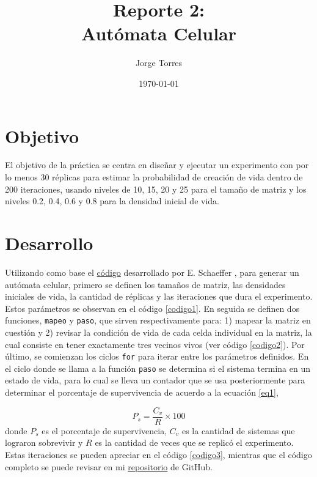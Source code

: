 \documentclass{article}
\title{Reporte 2:\\Aut\'omata Celular}
\author{Jorge Torres}
\date{\today}
\begin{document}
\maketitle

\section{Objetivo}
El objetivo de la pr\'actica se centra en diseñar y ejecutar un experimento con por lo menos 30 r\'eplicas para estimar la probabilidad de creaci\'on de vida dentro de 200 iteraciones, usando niveles de 10, 15, 20 y 25 para el tamaño de matriz y los niveles 0.2, 0.4, 0.6 y 0.8 para la densidad inicial de vida.

\section{Desarrollo}
Utilizando como base el \href{https://github.com/satuelisa/Simulation/blob/master/CellularAutomata/gameOfLife.py}{c\'odigo} desarrollado por E. Schaeffer \cite{elisa1}, para generar un aut\'omata celular, primero se definen los tamaños de matriz, las densidades iniciales de vida, la cantidad de r\'eplicas y las iteraciones que dura el experimento. Estos par\'ametros se observan en el c\'odigo \ref{codigo1}. En seguida se definen dos funciones, \texttt{mapeo} y \texttt{paso}, que sirven respectivamente para: 1) mapear la matriz en cuesti\'on y 2) revisar la condici\'on de vida de cada celda individual en la matriz, la cual consiste en tener exactamente tres vecinos vivos (ver c\'odigo \ref{codigo2}). Por \'ultimo, se comienzan los ciclos \texttt{for} para iterar entre los par\'ametros definidos. En el ciclo donde se llama a la funci\'on \texttt{paso} se determina si el sistema termina en un estado de vida, para lo cual se lleva un contador que se usa posteriormente para determinar el porcentaje de supervivencia de acuerdo a la ecuaci\'on \ref{eq1},

\begin{equation}
    P_{s}=\frac{C_{v}}{R} \times 100
    \label{eq1}
\end{equation}
donde $P_{s}$ es el porcentaje de supervivencia, $C_{v}$ es la cantidad de sistemas que lograron sobrevivir y $R$ es la cantidad de veces que se replic\'o el experimento. Estas iteraciones se pueden apreciar en el c\'odigo \ref{codigo3}, mientras que el c\'odigo completo se puede revisar en mi \href{https://github.com/FeroxDeitas/Simulacion-Nano/blob/main/Tareas/P2/game_life.py}{repositorio} de GitHub.\\
\end{document}
